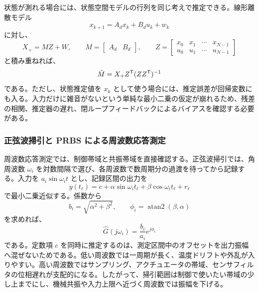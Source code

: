 状態が測れる場合には、状態空間モデルの行列を同じ考えで推定できる。線形離散モデル
\begin{equation}
  x_{k+1}=A_dx_k+B_du_k+w_k
\end{equation}
に対し、
\begin{equation}
  X_+=MZ+W,
  \qquad
  M=\begin{bmatrix}A_d&B_d\end{bmatrix},
  \qquad
  Z=
  \begin{bmatrix}
    x_0&x_1&\cdots&x_{N-1}\\
    u_0&u_1&\cdots&u_{N-1}
  \end{bmatrix}
\end{equation}
と積み重ねれば、
\begin{equation}
  \hat{M}=X_+Z^{\mathsf{T}}(ZZ^{\mathsf{T}})^{-1}
\end{equation}
である。ただし、状態推定値を $x_k$ として使う場合には、推定誤差が回帰変数にも入る。入力だけに雑音がないという単純な最小二乗の仮定が崩れるため、残差の相関、推定器の遅れ、閉ループフィードバックによるバイアスを確認する必要がある。

\subsubsection{正弦波掃引と PRBS による周波数応答測定}

周波数応答測定では、制御帯域と共振帯域を直接確認する。正弦波掃引では、角周波数 $\omega_i$ を対数間隔で選び、各周波数で数周期分の過渡を待ってから記録する。入力を $a_i\sin\omega_i t$ とし、記録区間の出力を
\begin{equation}
  y(t_\ell)=c+\alpha\sin\omega_i t_\ell+\beta\cos\omega_i t_\ell+r_\ell
\end{equation}
で最小二乗近似する。係数から
\begin{equation}
  b_i=\sqrt{\alpha^2+\beta^2},
  \qquad
  \phi_i=\operatorname{atan2}(\beta,\alpha)
\end{equation}
を求めれば、
\begin{equation}
  \hat{G}(j\omega_i)=\frac{b_i}{a_i}e^{j\phi_i}
\end{equation}
である。定数項 $c$ を同時に推定するのは、測定区間中のオフセットを出力振幅へ混ぜないためである。低い周波数では一周期が長く、温度ドリフトや外乱が入りやすい。高い周波数ではサンプリング、アクチュエータの帯域、センサフィルタの位相遅れが支配的になる。したがって、掃引範囲は制御で使いたい帯域の少し上までにし、機械共振や入力上限へ近づく周波数では振幅を下げる。

